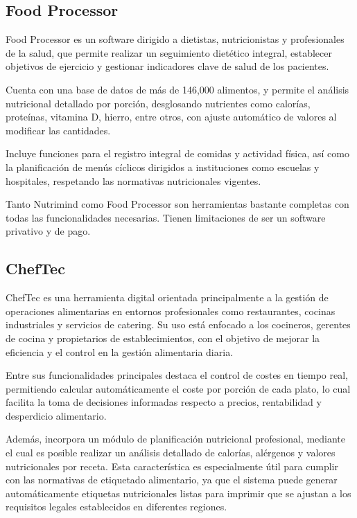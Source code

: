 \subsection{Food Processor\cite{FoodProcessor}}
Food Processor es un software dirigido a dietistas, nutricionistas y profesionales de la salud, que permite realizar un seguimiento dietético integral, establecer objetivos de ejercicio y gestionar indicadores clave de salud de los pacientes.

Cuenta con una base de datos de más de 146,000 alimentos, y permite el análisis nutricional detallado por porción, desglosando nutrientes como calorías, proteínas, vitamina D, hierro, entre otros, con ajuste automático de valores al modificar las cantidades.

Incluye funciones para el registro integral de comidas y actividad física, así como la planificación de menús cíclicos dirigidos a instituciones como escuelas y hospitales, respetando las normativas nutricionales vigentes.

Tanto Nutrimind como Food Processor son herramientas bastante completas con todas las funcionalidades necesarias. Tienen limitaciones de ser un software privativo y de pago.

\subsection{ChefTec\cite{Cheftec}}
ChefTec es una herramienta digital orientada principalmente a la gestión de operaciones alimentarias en entornos profesionales como restaurantes, cocinas industriales y servicios de catering. Su uso está enfocado a los cocineros, gerentes de cocina y propietarios de establecimientos, con el objetivo de mejorar la eficiencia y el control en la gestión alimentaria diaria.

Entre sus funcionalidades principales destaca el control de costes en tiempo real, permitiendo calcular automáticamente el coste por porción de cada plato, lo cual facilita la toma de decisiones informadas respecto a precios, rentabilidad y desperdicio alimentario.

Además, incorpora un módulo de planificación nutricional profesional, mediante el cual es posible realizar un análisis detallado de calorías, alérgenos y valores nutricionales por receta. Esta característica es especialmente útil para cumplir con las normativas de etiquetado alimentario, ya que el sistema puede generar automáticamente etiquetas nutricionales listas para imprimir que se ajustan a los requisitos legales establecidos en diferentes regiones.

